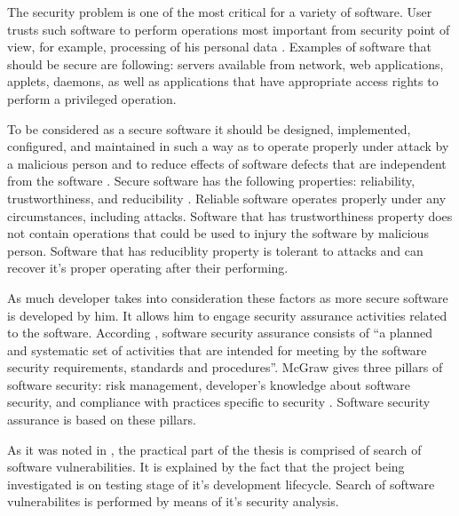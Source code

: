 %
The security problem is one of the most critical for a variety of software. 
%
User trusts such software to perform operations most important from security point of view, for example, processing of his personal data . 
%
Examples of software that should be secure are following: servers available from network, web applications, applets, daemons, as well as applications that have appropriate access rights to perform a privileged operation. 

%
To be considered as a secure software it should be designed, implemented, configured, and maintained in such a way as to operate properly under attack by a malicious person and to reduce effects of software defects that are independent from the software . 
%
Secure software has the following properties: reliability, trustworthiness, and reducibility . 
%
Reliable software operates properly under any circumstances, including attacks. 
%
Software that has trustworthiness property does not contain operations that could be used to injury the software by \A malicious person. 
%
Software that has reduciblity property is tolerant to attacks and can recover it's proper operating after their performing. 

%
As much developer takes into consideration these factors as more secure software is developed by him. 
%
It allows him to engage security assurance activities related to the software. 
%
According , software security assurance consists of ``a planned and systematic set of activities that are intended for meeting by the software security requirements, standards and procedures''. 
%
McGraw gives three pillars of software security: risk management, developer's knowledge about software security, and compliance with practices specific to security .
%
Software security assurance is based on these pillars. 

%
As it was noted in , the practical part of the thesis is comprised of search of software vulnerabilities. 
%
It is explained by the fact that the project being investigated is on \A testing stage of it's development lifecycle. 
%
Search of software vulnerabilites is performed by means of it's security analysis. 